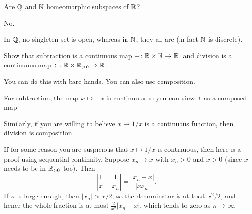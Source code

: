 \begin{problem}
	Are $\mathbb Q$ and $\mathbb N$ homeomorphic subspaces of $\mathbb R$?
	\begin{hint}
		No.
	\end{hint}
	\begin{sol}
		In $\mathbb Q$, no singleton set is open,
		whereas in $\mathbb N$, they all are (in fact $\mathbb N$ is discrete).
	\end{sol}
\end{problem}

\begin{problem}
	\label{prob:subtract_divide}
	Show that subtraction is a continuous map $- \colon \mathbb R \times \mathbb R \to \mathbb R$,
	and division is a continuous map $\div \colon \mathbb R \times \mathbb R_{>0} \to \mathbb R$.
	\begin{hint}
		You can do this with bare hands.
		You can also use composition.
	\end{hint}
	\begin{sol}
		For subtraction, the map $x \mapsto -x$ is continuous
		so you can view it as a composed map
		\begin{center}
		\end{center}
		Similarly, if you are willing to believe $x \mapsto 1/x$
		is a continuous function, then division is composition
		\begin{center}
		\end{center}
		If for some reason you are suspicious that $x \mapsto 1/x$ is continuous,
		then here is a proof using sequential continuity.
		Suppose $x_n \to x$ with $x_n > 0$ and $x > 0$
		(since $x$ needs to be in $\mathbb R_{>0}$ too).
		Then \[ \left\lvert \frac{1}{x} - \frac 1{x_n} \right\rvert
			= \frac{\left\lvert x_n-x \right\rvert}{\left\lvert x x_n \right\rvert}.
		\]
		If $n$ is large enough, then $\left\lvert x_n \right\rvert > x/2$;
		so the denominator is at least $x^2/2$,
		and hence the whole fraction is at most
		$\frac{2}{x^2} \left\lvert x_n-x \right\rvert$,
		which tends to zero as $n \to \infty$.
	\end{sol}
\end{problem}

